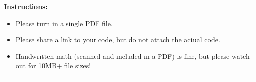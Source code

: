 \documentclass[11pt]{article}
\begin{document}
\renewcommand{\headrulewidth}{0.4pt}

{\bf Instructions:} 
\begin{itemize}[itemsep=-7pt]
	\item Please turn in a single PDF file. 
	\item Please share a link to your code, but do not attach the actual code. 
	\item Handwritten math (scanned and included in a PDF) is fine, but please watch out for 10MB+ file sizes!
\end{itemize}
\vspace{0.1in}\hrule
\end{document}
